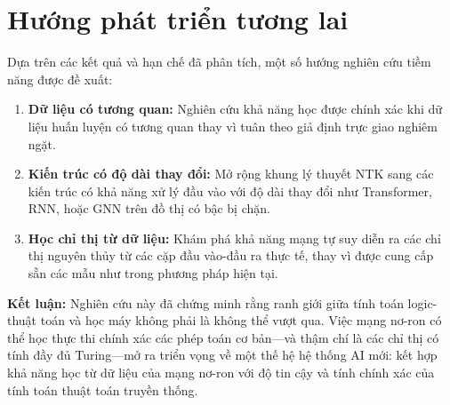 \section{Hướng phát triển tương lai}

Dựa trên các kết quả và hạn chế đã phân tích, một số hướng nghiên cứu tiềm năng được đề xuất:

\begin{enumerate}
    \item \textbf{Dữ liệu có tương quan:} Nghiên cứu khả năng học được chính xác khi dữ liệu huấn luyện có tương quan thay vì tuân theo giả định trực giao nghiêm ngặt.
    
    \item \textbf{Kiến trúc có độ dài thay đổi:} Mở rộng khung lý thuyết NTK sang các kiến trúc có khả năng xử lý đầu vào với độ dài thay đổi như Transformer, RNN, hoặc GNN trên đồ thị có bậc bị chặn.
    
    \item \textbf{Học chỉ thị từ dữ liệu:} Khám phá khả năng mạng tự suy diễn ra các chỉ thị nguyên thủy từ các cặp đầu vào-đầu ra thực tế, thay vì được cung cấp sẵn các mẫu như trong phương pháp hiện tại.
\end{enumerate}

\vspace{1em}

\textbf{Kết luận:} Nghiên cứu này đã chứng minh rằng ranh giới giữa tính toán logic-thuật toán và học máy không phải là không thể vượt qua. Việc mạng nơ-ron có thể học thực thi chính xác các phép toán cơ bản---và thậm chí là các chỉ thị có tính đầy đủ Turing---mở ra triển vọng về một thế hệ hệ thống AI mới: kết hợp khả năng học từ dữ liệu của mạng nơ-ron với độ tin cậy và tính chính xác của tính toán thuật toán truyền thống.
